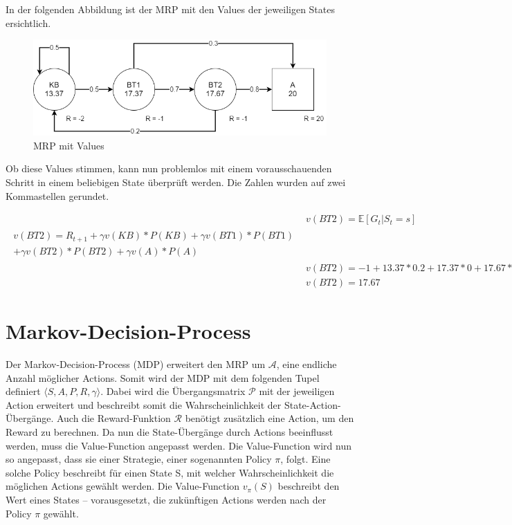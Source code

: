 In der folgenden Abbildung ist der MRP mit den Values der jeweiligen States ersichtlich.
 \begin{figure}[h]
  \centering
  \includegraphics[width=\textwidth]{img/Bellman_Expectation_Equation.png}
  \caption{MRP mit Values}
\end{figure}

Ob diese Values stimmen, kann nun problemlos mit einem vorausschauenden Schritt in einem beliebigen State überprüft werden. Die Zahlen wurden auf zwei Kommastellen gerundet.


\begin{align}
&v(BT2) = \mathbb{E} [G_t |{ S}_t=s] \nonumber\\
\begin{split}
v(BT2) =R_{t+1}+ \gamma v(KB)\ast P(KB)+ \gamma v(BT1)\ast P(BT1) \\
+ \gamma v(BT2)\ast P(BT2)+\gamma v(A)\ast P(A) 
\end{split}\nonumber\\ 
&v(BT2) =-1+ 13.37\ast0.2+ 17.37\ast0+ 17.67\ast0+20\ast0.8 \nonumber\\
&v(BT2) = 17.67 \label{calculate-mrp}
\end{align}


		
\section{Markov-Decision-Process}
Der Markov-Decision-Process (MDP) erweitert den MRP um $\mathcal{A}$, eine endliche Anzahl möglicher Actions. Somit wird der MDP mit dem folgenden Tupel definiert $\langle S,A,P,R,\gamma \rangle$.  Dabei wird die Übergangsmatrix $\mathcal{P}$ mit der jeweiligen Action erweitert und beschreibt somit die Wahrscheinlichkeit der State-Action-Übergänge. Auch die Reward-Funktion $\mathcal{R}$ benötigt zusätzlich eine Action, um den Reward zu berechnen. Da nun die State-Übergänge durch Actions beeinflusst werden, muss die Value-Function angepasst werden. Die Value-Function wird nun so angepasst, dass sie einer Strategie, einer sogenannten Policy $\pi$, folgt. Eine solche Policy beschreibt für einen State S, mit welcher Wahrscheinlichkeit die möglichen Actions gewählt werden. Die Value-Function $v_\pi(S)$ beschreibt den Wert eines States – vorausgesetzt, die zukünftigen Actions werden nach der Policy $\pi$ gewählt. 

